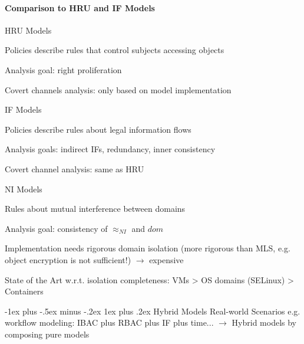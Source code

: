 \documentclass[a4paper]{article}
\makeatletter
\renewcommand{\subsubsection}{\@startsection{subsubsection}{3}{0mm}%
                                {-1ex plus -.5ex minus -.2ex}%
                                {1ex plus .2ex}%
                                {\normalfont\small\bfseries}}
\makeatother
\begin{document}
\begin{multicols}{3}
    \paragraph{Comparison to HRU and IF Models}
    \begin{itemize*}
        \item HRU Models
        \begin{itemize*}
            \item Policies describe rules that control subjects accessing objects
            \item Analysis goal: right proliferation
            \item Covert channels analysis: only based on model implementation
        \end{itemize*}
        \item IF Models
        \begin{itemize*}
            \item Policies describe rules about legal information flows
            \item Analysis goals: indirect IFs, redundancy, inner consistency
            \item Covert channel analysis: same as HRU
        \end{itemize*}
        \item NI Models
        \begin{itemize*}
            \item Rules about mutual interference between domains
            \item Analysis goal: consistency of $\approx_{NI}$ and $dom$
            \item Implementation needs rigorous domain isolation (more rigorous than MLS, e.g. object encryption is not sufficient!) $\rightarrow$ expensive
            \item State of the Art w.r.t. isolation completeness: VMs > OS domains (SELinux) > Containers
        \end{itemize*}
    \end{itemize*}

    \subsubsection{Hybrid Models}
    Real-world Scenarios e.g. workflow modeling: IBAC plus RBAC plus IF plus time... $\rightarrow$ Hybrid models by composing pure models


\end{multicols}
\end{document}
